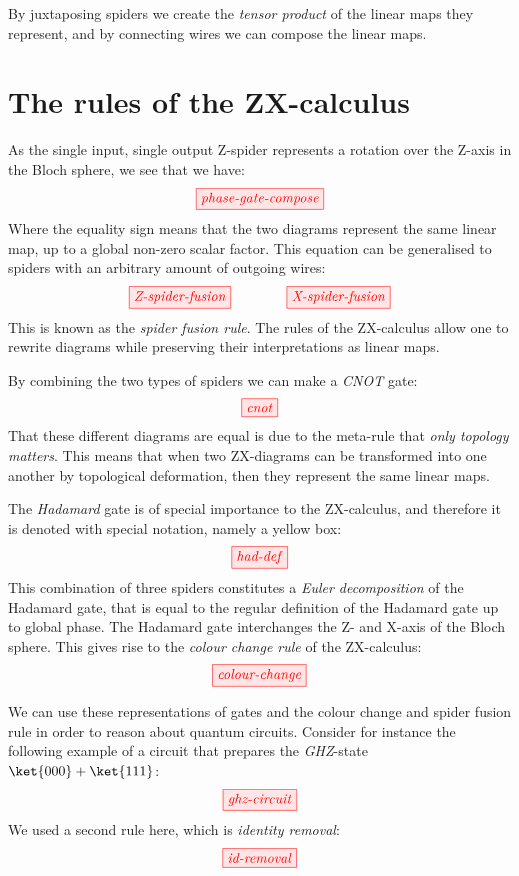\documentclass[a4paper, 12pt]{article}
\begin{document}
By juxtaposing spiders we create the \emph{tensor product} of the linear maps they represent, and by connecting wires we can compose the linear maps. 

\section{The rules of the ZX-calculus}
As the single input, single output Z-spider represents a rotation over the Z-axis in the Bloch sphere, we see that we have:
\begin{equation*}
    \tikzfig{phase-gate-compose}
\end{equation*}
Where the equality sign means that the two diagrams represent the same linear map, up to a global non-zero scalar factor. This equation can be generalised to spiders with an arbitrary amount of outgoing wires:
\begin{equation*}
    \tikzfig{Z-spider-fusion} \qquad\qquad \tikzfig{X-spider-fusion}
\end{equation*}
This is known as the \emph{spider fusion rule}. The rules of the ZX-calculus allow one to rewrite diagrams while preserving their interpretations as linear maps.

By combining the two types of spiders we can make a \emph{CNOT} gate:
\begin{equation*}
    \tikzfig{cnot}
\end{equation*}
That these different diagrams are equal is due to the meta-rule that \emph{only topology matters}. This means that when two ZX-diagrams can be transformed into one another by topological deformation, then they represent the same linear maps.

The \emph{Hadamard} gate is of special importance to the ZX-calculus, and therefore it is denoted with special notation, namely a yellow box:
\begin{equation*}
    \tikzfig{had-def}
\end{equation*}
This combination of three spiders constitutes a \emph{Euler decomposition} of the Hadamard gate, that is equal to the regular definition of the Hadamard gate up to global phase. The Hadamard gate interchanges the Z- and X-axis of the Bloch sphere. This gives rise to the \emph{colour change rule} of the ZX-calculus:
\begin{equation*}
    \tikzfig{colour-change}
\end{equation*}

We can use these representations of gates and the colour change and spider fusion rule in order to reason about quantum circuits. Consider for instance the following example of a circuit that prepares the \emph{GHZ}-state $\ket{000}+\ket{111}$:
\begin{equation*}
    \tikzfig{ghz-circuit}
\end{equation*}
We used a second rule here, which is \emph{identity removal}:
\begin{equation*}
    \tikzfig{id-removal}
\end{equation*}
\end{document}

